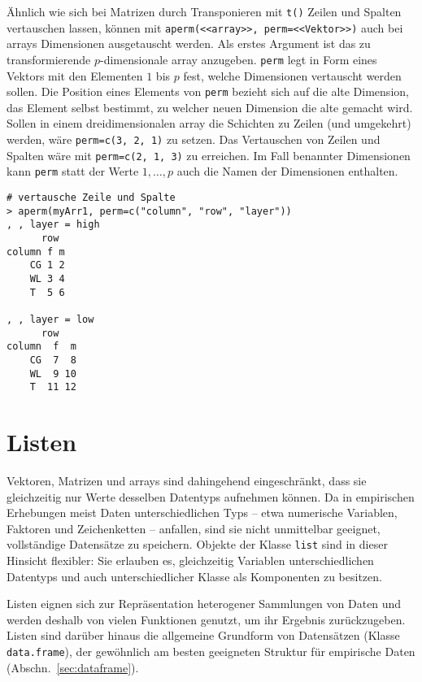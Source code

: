 Ähnlich wie sich bei Matrizen durch Transponieren mit \lstinline!t()! Zeilen und Spalten vertauschen lassen, können mit \lstinline!aperm(<<array>>, perm=<<Vektor>>)! auch bei arrays Dimensionen ausgetauscht werden. Als erstes Argument ist das zu transformierende $p$-dimensionale array anzugeben. \lstinline!perm! legt in Form eines Vektors mit den Elementen $1$ bis $p$ fest, welche Dimensionen vertauscht werden sollen. Die Position eines Elements von \lstinline!perm! bezieht sich auf die alte Dimension, das Element selbst bestimmt, zu welcher neuen Dimension die alte gemacht wird. Sollen in einem dreidimensionalen array die Schichten zu Zeilen (und umgekehrt) werden, wäre \lstinline!perm=c(3, 2, 1)! zu setzen. Das Vertauschen von Zeilen und Spalten wäre mit \lstinline!perm=c(2, 1, 3)! zu erreichen. Im Fall benannter Dimensionen kann \lstinline!perm! statt der Werte $1, \ldots, p$ auch die Namen der Dimensionen enthalten.
\begin{lstlisting}
# vertausche Zeile und Spalte
> aperm(myArr1, perm=c("column", "row", "layer"))
, , layer = high
      row
column f m
    CG 1 2
    WL 3 4
    T  5 6

, , layer = low
      row
column  f  m
    CG  7  8
    WL  9 10
    T  11 12
\end{lstlisting}

\section{Listen}
\label{sec:list}

Vektoren, Matrizen und arrays sind dahingehend eingeschränkt, dass sie gleichzeitig nur Werte desselben Datentyps aufnehmen können. Da in empirischen Erhebungen meist Daten unterschiedlichen Typs -- etwa numerische Variablen, Faktoren und Zeichenketten -- anfallen, sind sie nicht unmittelbar geeignet, vollständige Datensätze zu speichern. Objekte der Klasse \lstinline!list! sind in dieser Hinsicht flexibler: Sie erlauben es, gleichzeitig Variablen unterschiedlichen Datentyps und auch unterschiedlicher Klasse als Komponenten zu besitzen.

Listen eignen sich zur Repräsentation heterogener Sammlungen von Daten und werden deshalb von vielen Funktionen genutzt, um ihr Ergebnis zurückzugeben. Listen sind darüber hinaus die allgemeine Grundform von Datensätzen (Klasse \lstinline!data.frame!), der gewöhnlich am besten geeigneten Struktur für empirische Daten (Abschn.\ \ref{sec:dataframe}).


